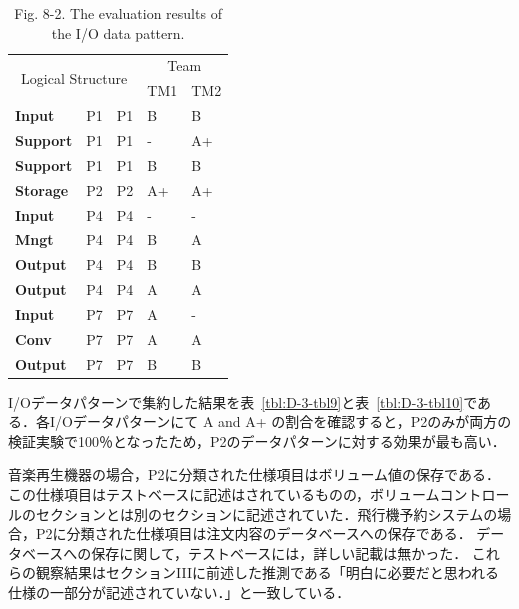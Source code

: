 \begin{table}[htbp]
\centering
\caption{Fig. 8-2. The evaluation results of the I/O data pattern.}
  \begin{tabular}{|l|l|l|l|l|}
  \hline
  \multicolumn{3}{|c|}{\multirow{2}[4]{*}{Logical
Structure}} & \multicolumn{2}{c|}{Team} \bigstrut\\
\cline{4-5}    \multicolumn{3}{|c|}{} & TM1   & TM2 \bigstrut\\
  \hline
  \textbf{Input} & P1    & P1    & B     & B \bigstrut\\
  \hline
  \textbf{Support} & P1    & P1    & -     & A+ \bigstrut\\
  \hline
  \textbf{Support} & P1    & P1    & B     & B \bigstrut\\
  \hline
  \textbf{Storage} & P2    & P2    & A+    & A+ \bigstrut\\
  \hline
  \textbf{Input} & P4    & P4    & -     & - \bigstrut\\
  \hline
  \textbf{Mngt} & P4    & P4    & B     & A \bigstrut\\
  \hline
  \textbf{Output} & P4    & P4    & B     & B \bigstrut\\
  \hline
  \textbf{Output} & P4    & P4    & A     & A \bigstrut\\
  \hline
  \textbf{Input} & P7    & P7    & A     & - \bigstrut\\
  \hline
  \textbf{Conv} & P7    & P7    & A     & A \bigstrut\\
  \hline
  \textbf{Output} & P7    & P7    & B     & B \bigstrut\\
  \hline
  \end{tabular}%
\label{tbl:D-3-tbl8}%
\end{table}%

I/Oデータパターンで集約した結果を表~\ref{tbl:D-3-tbl9}と表~\ref{tbl:D-3-tbl10}である．各I/Oデータパターンにて A and A+ の割合を確認すると，P2のみが両方の検証実験で100％となったため，P2のデータパターンに対する効果が最も高い．

音楽再生機器の場合，P2に分類された仕様項目はボリューム値の保存である．この仕様項目はテストベースに記述はされているものの，ボリュームコントロールのセクションとは別のセクションに記述されていた．飛行機予約システムの場合，P2に分類された仕様項目は注文内容のデータベースへの保存である． データベースへの保存に関して，テストベースには，詳しい記載は無かった． これらの観察結果はセクションIIIに前述した推測である「明白に必要だと思われる仕様の一部分が記述されていない．」と一致している．


